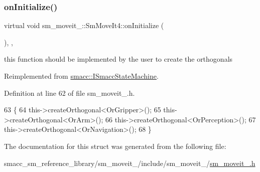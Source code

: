 \subsubsection{\texorpdfstring{on\+Initialize()}{onInitialize()}}
{\footnotesize\ttfamily virtual void sm\+\_\+moveit\+\_\+::\+Sm\+Move\+It4\+::on\+Initialize (\begin{DoxyParamCaption}{ }\end{DoxyParamCaption})\hspace{0.3cm}{\ttfamily [inline]}, {\ttfamily [override]}, {\ttfamily [virtual]}}



this function should be implemented by the user to create the orthogonals 



Reimplemented from \hyperlink{classsmacc_1_1ISmaccStateMachine_ac2982c6c8283663e5e1e8a7c82f511ec}{smacc\+::\+I\+Smacc\+State\+Machine}.



Definition at line 62 of file sm\+\_\+moveit\+\_.\+h.


\begin{DoxyCode}
63     \{
64         this->createOrthogonal<OrGripper>();
65         this->createOrthogonal<OrArm>();
66         this->createOrthogonal<OrPerception>();
67         this->createOrthogonal<OrNavigation>();
68     \}
\end{DoxyCode}


The documentation for this struct was generated from the following file\+:\begin{DoxyCompactItemize}
\item 
smacc\+\_\+sm\+\_\+reference\+\_\+library/sm\+\_\+moveit\+\_/include/sm\+\_\+moveit\+\_/\hyperlink{sm__moveit__4_8h}{sm\+\_\+moveit\+\_.\+h}\end{DoxyCompactItemize}
